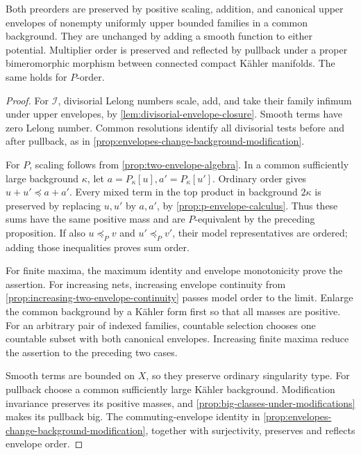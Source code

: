 \begin{proposition}\label{prop:preorders-algebra-and-envelopes}
Both preorders are preserved by positive scaling, addition, and canonical upper envelopes of nonempty uniformly upper bounded families in a common background. They are unchanged by adding a smooth function to either potential. Multiplier order is preserved and reflected by pullback under a proper bimeromorphic morphism between connected compact K\"ahler manifolds. The same holds for $P$-order.
\end{proposition}
\begin{proof}
For $\mathcal I$, divisorial Lelong numbers scale, add, and take their family infimum under upper envelopes, by \cref{lem:divisorial-envelope-closure}. Smooth terms have zero Lelong number. Common resolutions identify all divisorial tests before and after pullback, as in \cref{prop:envelopes-change-background-modification}.

For $P$, scaling follows from \cref{prop:two-envelope-algebra}. In a common sufficiently large background $\kappa$, let $a=P_\kappa[u],a'=P_\kappa[u']$. Ordinary order gives $u+u'\preceq a+a'$. Every mixed term in the top product in background $2\kappa$ is preserved by replacing $u,u'$ by $a,a'$, by \cref{prop:p-envelope-calculus}. Thus these sums have the same positive mass and are $P$-equivalent by the preceding proposition. If also $u\preceq_P v$ and $u'\preceq_P v'$, their model representatives are ordered; adding those inequalities proves sum order.

For finite maxima, the maximum identity and envelope monotonicity prove the assertion. For increasing nets, increasing envelope continuity from \cref{prop:increasing-two-envelope-continuity} passes model order to the limit. Enlarge the common background by a K\"ahler form first so that all masses are positive. For an arbitrary pair of indexed families, countable selection chooses one countable subset with both canonical envelopes. Increasing finite maxima reduce the assertion to the preceding two cases.

Smooth terms are bounded on $X$, so they preserve ordinary singularity type. For pullback choose a common sufficiently large K\"ahler background. Modification invariance preserves its positive masses, and \cref{prop:big-classes-under-modifications} makes its pullback big. The commuting-envelope identity in \cref{prop:envelopes-change-background-modification}, together with surjectivity, preserves and reflects envelope order.
\end{proof}

